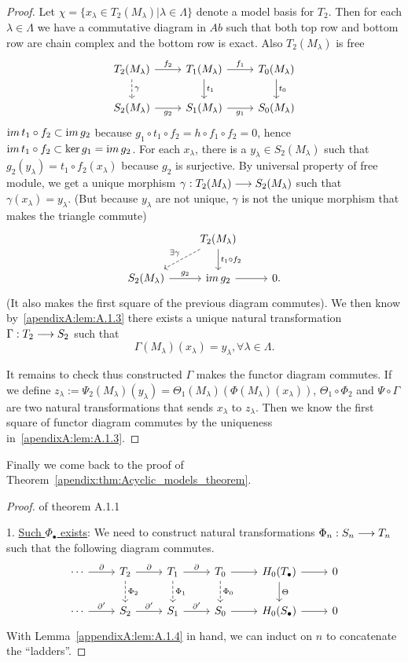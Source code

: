 \documentclass[11pt]{book} %
\begin{document}
\begin{proposition}
\begin{proof}
Let $\chi=\{x_\lambda\in T_2(M_\lambda)|\lambda\in \Lambda\}$ denote a model basis for $T_2$. Then for each $\lambda\in \Lambda$ we have a commutative diagram in $Ab$ such that both top row and bottom row are chain complex and the bottom row is exact. Also $T_2(M_\lambda)$ is free 
\[
\begin{tikzcd}
T_2(M_\lambda)\ar[d, dashed, "\gamma"] \arrow[r, "f_2"] & T_1(M_\lambda) \arrow[r, "f_1"] \arrow[d, "t_1"] & T_0(M_\lambda) \arrow[d, "t_0"] \\
S_2(M_\lambda) \arrow[r, "g_2"'] & S_1(M_\lambda) \arrow[r, "g_1"'] & S_0(M_\lambda)
\end{tikzcd}
\]
${\text im\thinspace} t_1\circ f_2\subset {\text im\thinspace} g_2$ because $g_1\circ t_1\circ f_2=h\circ f_1\circ f_2=0$, hence ${\text im\thinspace} t_1\circ f_2\subset \ker g_1={\text im\thinspace} g_2$. For each $x_\lambda$, there is a $y_\lambda\in S_2(M_\lambda)$ such that $g_2(y_\lambda)=t_1\circ f_2(x_\lambda)$ because $g_2$ is surjective. By universal property of free module, we get a unique morphism $\gamma:T_2(M_\lambda)\longrightarrow S_2(M_\lambda)$ such that $\gamma(x_\lambda)=y_\lambda$. (But because $y_\lambda$ are not unique, $\gamma$ is not the unique morphism that makes the triangle commute)
\[
\begin{tikzcd}
 & T_2(M_\lambda) \arrow[d, "t_1\circ f_2"] \arrow[ld, "\exists \gamma"', dashed] &  \\
S_2(M_\lambda) \arrow[r, "g_2"] & \im g_2 \arrow[r] & 0.
\end{tikzcd}
\]
(It also makes the first square of the previous diagram commutes).
We then know by~\ref{apendixA:lem:A.1.3} there exists a unique natural transformation $\Gamma: T_2\longrightarrow S_2$ such that
$$
\Gamma(M_\lambda)(x_\lambda)=y_\lambda, \forall \lambda\in \Lambda.
$$ 

It remains to check thus constructed $\Gamma$ makes the functor diagram commutes. If we define $z_\lambda:=\Psi_2(M_\lambda)(y_\lambda)=\Theta_1(M_\lambda)(\Phi(M_\lambda)(x_\lambda))$, $\Theta_1\circ\Phi_2$ and $\Psi\circ \Gamma$ are two natural transformations that sends $x_\lambda$ to $z_\lambda$. Then we know the first square of functor diagram commutes by the uniqueness in~\ref{apendixA:lem:A.1.3}.
\end{proof}
Finally we come back to the proof of Theorem~\ref{apendix:thm:Acyclic_models_theorem}.
\begin{proof}{of theorem A.1.1}

1. \underline{Such $\Phi_\bullet$ exists}: 
We need to construct natural transformations $\Phi_n:S_n\longrightarrow T_n$ such that the following diagram commutes.
\[\begin{tikzcd}
\cdots \arrow[r, "\pd"] & T_2 \arrow[r, "\pd"] \arrow[d, "\Phi_2", dashed] & T_1 \arrow[r, "\pd"] \arrow[d, "\Phi_1", dashed] & T_0 \arrow[r] \arrow[d, "\Phi_0", dashed] & H_0(T_\bullet) \arrow[r] \arrow[d, "\Theta"] & 0 \\
\cdots \arrow[r, "\pd'"] & S_2 \arrow[r, "\pd'"] & S_1 \arrow[r, "\pd'"] & S_0 \arrow[r] & H_0(S_\bullet) \arrow[r] & 0
\end{tikzcd}
\]
With Lemma~\ref{appendixA:lem:A.1.4} in hand, we can induct on $n$ to concatenate the ``ladders''.


\end{proof}
\end{proposition}
\end{document}
